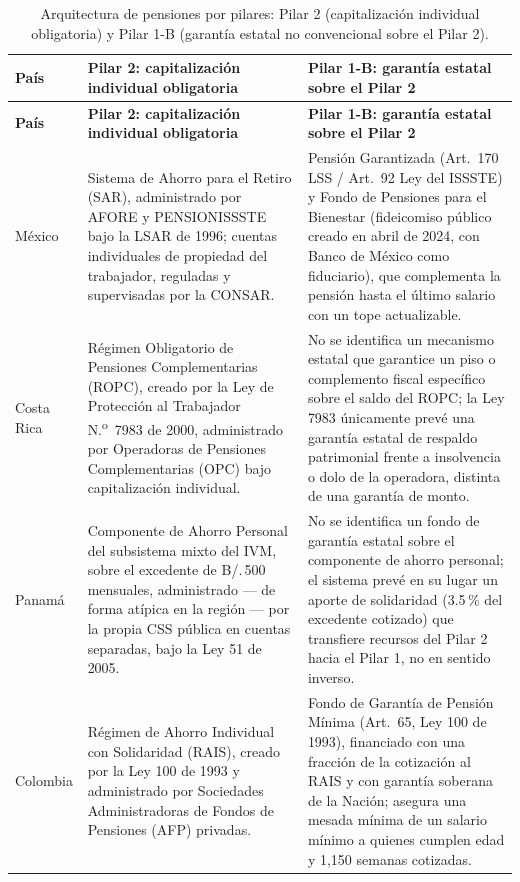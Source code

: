 \documentclass[12pt, letterpaper]{article}
\begin{document}
\begin{xltabular}{\textwidth}{P{2.1cm}Y Y}
\caption{Arquitectura de pensiones por pilares: Pilar 2 (capitalización individual obligatoria) y Pilar 1-B (garantía estatal no convencional sobre el Pilar 2).}
\label{tab:pilares_2g}\\
\toprule
\textbf{País} & \textbf{Pilar 2: capitalización individual obligatoria} & \textbf{Pilar 1-B: garantía estatal sobre el Pilar 2} \\
\midrule
\endfirsthead

\toprule
\textbf{País} & \textbf{Pilar 2: capitalización individual obligatoria} & \textbf{Pilar 1-B: garantía estatal sobre el Pilar 2} \\
\midrule
\endhead

\bottomrule
\endfoot

México &
Sistema de Ahorro para el Retiro (SAR), administrado por AFORE y PENSIONISSSTE bajo la LSAR de 1996; cuentas individuales de propiedad del trabajador, reguladas y supervisadas por la CONSAR. &
Pensión Garantizada (Art.\ 170 LSS / Art.\ 92 Ley del ISSSTE) y Fondo de Pensiones para el Bienestar (fideicomiso público creado en abril de 2024, con Banco de México como fiduciario), que complementa la pensión hasta el último salario con un tope actualizable. \\

Costa Rica &
Régimen Obligatorio de Pensiones Complementarias (ROPC), creado por la Ley de Protección al Trabajador N.\textsuperscript{o}~7983 de 2000, administrado por Operadoras de Pensiones Complementarias (OPC) bajo capitalización individual. &
No se identifica un mecanismo estatal que garantice un piso o complemento fiscal específico sobre el saldo del ROPC; la Ley 7983 únicamente prevé una garantía estatal de respaldo patrimonial frente a insolvencia o dolo de la operadora, distinta de una garantía de monto. \\

Panamá &
Componente de Ahorro Personal del subsistema mixto del IVM, sobre el excedente de B/.\,500 mensuales, administrado --- de forma atípica en la región --- por la propia CSS pública en cuentas separadas, bajo la Ley 51 de 2005. &
No se identifica un fondo de garantía estatal sobre el componente de ahorro personal; el sistema prevé en su lugar un aporte de solidaridad (3.5\,\% del excedente cotizado) que transfiere recursos del Pilar 2 hacia el Pilar 1, no en sentido inverso. \\

Colombia &
Régimen de Ahorro Individual con Solidaridad (RAIS), creado por la Ley 100 de 1993 y administrado por Sociedades Administradoras de Fondos de Pensiones (AFP) privadas. &
Fondo de Garantía de Pensión Mínima (Art.\ 65, Ley 100 de 1993), financiado con una fracción de la cotización al RAIS y con garantía soberana de la Nación; asegura una mesada mínima de un salario mínimo a quienes cumplen edad y 1{,}150 semanas cotizadas. \\


\end{xltabular}
\end{document}
